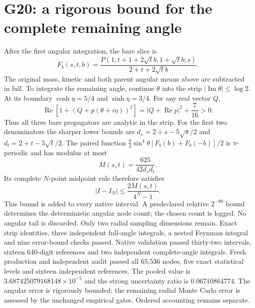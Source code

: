 \documentclass[11pt]{article}
\begin{document}
\section*{G20: a rigorous bound for the complete remaining angle}
After the first angular integration, the bare slice is
\[
 F_b(s,t,b)=\frac{P(1,t+1+2\sqrt t b,1+\sqrt t b;s)}
                  {2+t+2\sqrt t b}.
\]
The original mass, kinetic and both parent angular means above are
subtracted in full. To integrate the remaining angle, continue
$\theta$ into the strip $|\operatorname{Im}\theta|\leq\log2$.
At its boundary $\cosh\eta=5/4$ and $\sinh\eta=3/4$.
For any real vector $Q$,
\[
 \operatorname{Re}[1+(Q+p(\theta+i\eta))^2]
 =|Q+\operatorname{Re}p|^2+\frac7{16}>0.
\]
Thus all three bare propagators are analytic in the strip. For the
first two denominators the sharper lower bounds are
$d_s=2+s-5\sqrt s/2$ and $d_t=2+t-5\sqrt t/2$.
The paired function $\tfrac83\sin^4\theta[F_b(b)+F_b(-b)]/2$
is $\pi$-periodic and has modulus at most
\[
 M(s,t)=\frac{625}{42d_sd_t}.
\]
Its complete $N$-point midpoint rule therefore satisfies
\[
 |I-I_N|\leq\frac{2M(s,t)}{4^N-1}.
\]
This bound is added to every native interval. A predeclared relative
$2^{-80}$ bound determines the deterministic angular node count;
the chosen count is logged. No angular tail is discarded. Only two
radial sampling dimensions remain. Exact strip identities, three
independent full-angle integrals, a nested Feynman integral and nine
error-bound checks passed. Native validation passed thirty-two intervals,
sixteen 640-digit references and two independent complete-angle integrals.
Fresh production and independent audit passed all 65,536 nodes,
five exact statistical levels and sixteen independent references.
The pooled value is $3.687425079168148\times10^{-5}$ and the strong
uncertainty ratio is $0.06710864774$. The angular error is rigorously
bounded; the remaining radial Monte Carlo error is assessed by the
unchanged empirical gates. Ordered accounting remains separate.
\end{document}
